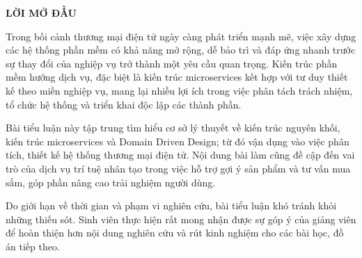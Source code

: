 \documentclass[../main.tex]{subfiles}
\begin{document}
\begin{center}
    \large{\color{primary}\textbf{LỜI MỞ ĐẦU}}\\
\end{center}
\vspace{1cm}
Trong bối cảnh thương mại điện tử ngày càng phát triển mạnh mẽ, việc xây dựng các hệ thống phần mềm có khả năng mở rộng, dễ bảo trì và đáp ứng nhanh trước sự thay đổi của nghiệp vụ trở thành một yêu cầu quan trọng. Kiến trúc phần mềm hướng dịch vụ, đặc biệt là kiến trúc microservices kết hợp với tư duy thiết kế theo miền nghiệp vụ, mang lại nhiều lợi ích trong việc phân tách trách nhiệm, tổ chức hệ thống và triển khai độc lập các thành phần.

Bài tiểu luận này tập trung tìm hiểu cơ sở lý thuyết về kiến trúc nguyên khối, kiến trúc microservices và Domain Driven Design; từ đó vận dụng vào việc phân tích, thiết kế hệ thống thương mại điện tử. Nội dung bài làm cũng đề cập đến vai trò của dịch vụ trí tuệ nhân tạo trong việc hỗ trợ gợi ý sản phẩm và tư vấn mua sắm, góp phần nâng cao trải nghiệm người dùng.

Do giới hạn về thời gian và phạm vi nghiên cứu, bài tiểu luận khó tránh khỏi những thiếu sót. Sinh viên thực hiện rất mong nhận được sự góp ý của giảng viên để hoàn thiện hơn nội dung nghiên cứu và rút kinh nghiệm cho các bài học, đồ án tiếp theo.
\end{document}
